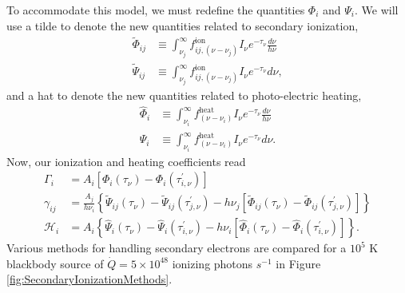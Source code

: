 \documentclass[letterpaper,titlepage,12pt]{article}
\numberwithin{equation}{section}
\newcommand{\fheatE}{f_{(\nu - \nu_i)}^{\text{heat}}}
\newcommand{\fionE}{f_{ij,(\nu - \nu_j)}^{\text{ion}}}
\newcommand{\Heat}{\mathcal{H}}
\begin{document}
To accommodate this model, we must redefine the quantities $\Phi_i$ and $\Psi_i$.  We will use a tilde to denote the new quantities related to secondary ionization, 
\begin{align}
    \widetilde{\Phi}_{ij} & \equiv \int_{\nu_j}^{\infty} \fionE I_{\nu} e^{-\tau_{\nu}} \frac{d\nu}{h\nu} \\
    \widetilde{\Psi}_{ij} & \equiv \int_{\nu_j}^{\infty} \fionE I_{\nu} e^{-\tau_{\nu}} d\nu ,
\end{align}
and a hat to denote the new quantities related to photo-electric heating,
\begin{align}
    \widehat{\Phi}_i & \equiv \int_{\nu_i}^{\infty} \fheatE I_{\nu} e^{-\tau_{\nu}} \frac{d\nu}{h\nu} \\
    \widehat{\Psi}_i & \equiv \int_{\nu_i}^{\infty} \fheatE I_{\nu} e^{-\tau_{\nu}} d\nu .
\end{align}
Now, our ionization and heating coefficients read
\begin{align}
    \Gamma_i & = A_i \left[\Phi_i(\tau_{\nu}) - \Phi_i(\tau_{i,\nu}^{\prime}) \right] \label{eq:Gamma_PhiPsi_complex} \\
    \gamma_{ij} & = \frac{A_j}{h\nu_i} \left\{\widetilde{\Psi}_{ij}(\tau_{\nu}) - \widetilde{\Psi}_{ij}(\tau_{j,\nu}^{\prime}) - h \nu_j \left[\widetilde{\Phi}_{ij}(\tau_{\nu}) - \widetilde{\Phi}_{ij}(\tau_{j,\nu}^{\prime}) \right] \right\}  \label{eq:gamma_PhiPsi_complex} \\
    \Heat_i & = A_i \left\{\widehat{\Psi}_i(\tau_{\nu}) - \widehat{\Psi}_i(\tau_{i,\nu}^{\prime}) - h\nu_i \left[\widehat{\Phi}_i(\tau_{\nu}) - \widehat{\Phi}_i(\tau_{i,\nu}^{\prime}) \right] \right\} \label{eq:Heat_PhiPsi_complex} .  
\end{align}    
Various methods for handling secondary electrons are compared for a $10^5$ K blackbody source of $\dot{Q} = 5 \times 10^{48}$ ionizing photons $s^{-1}$ in Figure \ref{fig:SecondaryIonizationMethods}.
\end{document}
